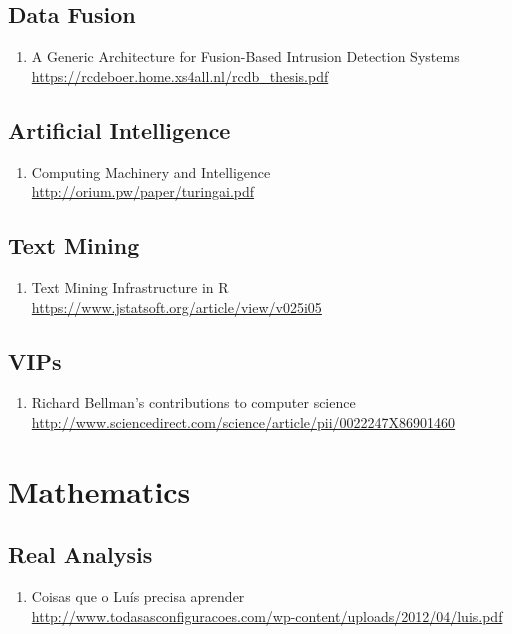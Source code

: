\documentclass{article}
\begin{document}
\subsection{Data Fusion}

\begin{enumerate}
	\item {A Generic Architecture for Fusion-Based Intrusion Detection Systems\\
\url{https://rcdeboer.home.xs4all.nl/rcdb_thesis.pdf}}
\end{enumerate}

\subsection{Artificial Intelligence}
\begin{enumerate}
	\item {Computing Machinery and Intelligence\\ \url{http://orium.pw/paper/turingai.pdf}}
\end{enumerate}

\subsection{Text Mining}
\begin{enumerate}
	\item {Text Mining Infrastructure in R\\ \url{https://www.jstatsoft.org/article/view/v025i05}}
\end{enumerate}

\subsection{VIPs}
\begin{enumerate}
	\item {Richard Bellman's contributions to computer science\\\url{http://www.sciencedirect.com/science/article/pii/0022247X86901460}}
\end{enumerate}

\section{Mathematics}
\subsection{Real Analysis}
\begin{enumerate}
	\item {Coisas que o Luís precisa aprender\\
\url{http://www.todasasconfiguracoes.com/wp-content/uploads/2012/04/luis.pdf}}
\end{enumerate}
\end{document}
